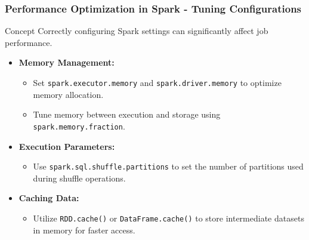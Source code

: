 \documentclass[aspectratio=169]{beamer}
\begin{document}
\begin{frame}[fragile]
    \frametitle{Performance Optimization in Spark - Tuning Configurations}
    \begin{block}{Concept}
        Correctly configuring Spark settings can significantly affect job performance.
    \end{block}
    
    \begin{itemize}
        \item \textbf{Memory Management:}
        \begin{itemize}
            \item Set \texttt{spark.executor.memory} and \texttt{spark.driver.memory} to optimize memory allocation.
            \item Tune memory between execution and storage using \texttt{spark.memory.fraction}.
        \end{itemize}

        \item \textbf{Execution Parameters:}
        \begin{itemize}
            \item Use \texttt{spark.sql.shuffle.partitions} to set the number of partitions used during shuffle operations.
        \end{itemize}

        \item \textbf{Caching Data:}
        \begin{itemize}
            \item Utilize \texttt{RDD.cache()} or \texttt{DataFrame.cache()} to store intermediate datasets in memory for faster access.
        \end{itemize}
    \end{itemize}
\end{frame}
\end{document}
